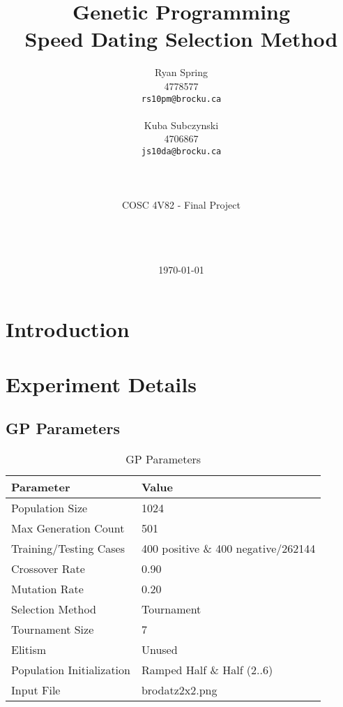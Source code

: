 \documentclass[titlepage,letterpaper]{article}
\title{Genetic Programming \\ Speed Dating Selection Method}
\author{Ryan Spring \\ 4778577 \\ \texttt{rs10pm@brocku.ca} \\ \\ Kuba Subczynski \\ 4706867 \\ \texttt{js10da@brocku.ca} 
\\
\\
\\
\\
COSC 4V82 - Final Project
\\
\\ 
\\
\\}
\date{\today}
\begin{document}
\maketitle

\begin{abstract}


\end{abstract}
 
 
\tableofcontents
\newpage

\section{Introduction}
\label{sec:Introduction}


\section{Experiment Details}
\label{sec:ExperimentDetails}


\subsection{GP Parameters}
\label{sec:Parameters}


\begin{table}[H]
\centering
\begin{tabular}{p{4cm} | p{6cm} } 
Parameter & Value \\\hline
Population Size & 1024\\
Max Generation Count & 501\\
Training/Testing Cases & 400 positive \& 400 negative/262144\\
Crossover Rate & 0.90\\
Mutation Rate & 0.20\\
Selection Method & Tournament\\
Tournament Size & 7\\
Elitism & Unused\\
Population Initialization & Ramped Half \& Half (2..6)\\
Input File & brodatz2x2.png \\
\end{tabular}
\caption{GP Parameters} 
\label{tab:params}
\end{table}
\end{document}
